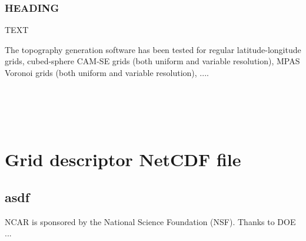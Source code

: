 \documentclass[gmd]{copernicus}
\begin{document}
\subsubsection{HEADING}
TEXT




\conclusions  %
The topography generation software has been tested for regular latitude-longitude grids, cubed-sphere CAM-SE grids (both uniform and variable resolution), MPAS Voronoi grids (both uniform and variable resolution), ....




\appendix
\section{\\ \\ \hspace*{-7mm} Grid descriptor NetCDF file}    %

\subsection{asdf}                               %




\begin{acknowledgements}
NCAR is sponsored by the National Science Foundation (NSF). Thanks to DOE ...
\end{acknowledgements}






%
%
%
%


\end{document}
